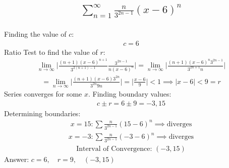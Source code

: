 \documentclass{article}
\begin{document}
\subsection{
	\begin{align*}
		\sum_{n = 1}^\infty \frac{n}{3^{2n - 1}} (x - 6)^n
	\end{align*}
}
Finding the value of $c$:
\begin{align*}
	c = 6
\end{align*}
Ratio Test to find the value of $r$:
\begin{align*}
	\lim_{n \to \infty} \bigg| \frac{(n + 1)(x - 6)^{n + 1}}{3^{2(n + 1) - 1}} \frac{3^{2n - 1}}{n(x - 6)^n} \bigg| = \lim_{n \to \infty} \bigg| \frac{(n + 1)(x - 6)^n 3^{2n - 1}}{3^{2n + 1}n} \bigg|
\end{align*}
\begin{align*}
	= \lim_{n \to \infty} \bigg| \frac{(n + 1)(x - 6) 3^{2n}}{3^{2n}9n} \bigg| = \bigg| \frac{x - 6}{9} \bigg| < 1 \implies |x - 6| < 9 = r
\end{align*}
Series converges for some $x$. Finding boundary values:
\begin{align*}
	c \pm r = 6 \pm 9 = -3, 15
\end{align*}
Determining boundaries:
\begin{align*}
	x = 15: \sum \frac{n}{3^{2n - 1}} (15 - 6)^n \implies \text{diverges}
\end{align*}
\begin{align*}
	x = -3: \sum \frac{n}{3^{2n - 1}} (-3 - 6)^n \implies \text{diverges}
\end{align*}
\begin{align*}
	\text{Interval of Convergence: } (-3, 15)
\end{align*}
Answer: $c = 6, \quad r = 9, \quad (-3, 15)$

\end{document}
